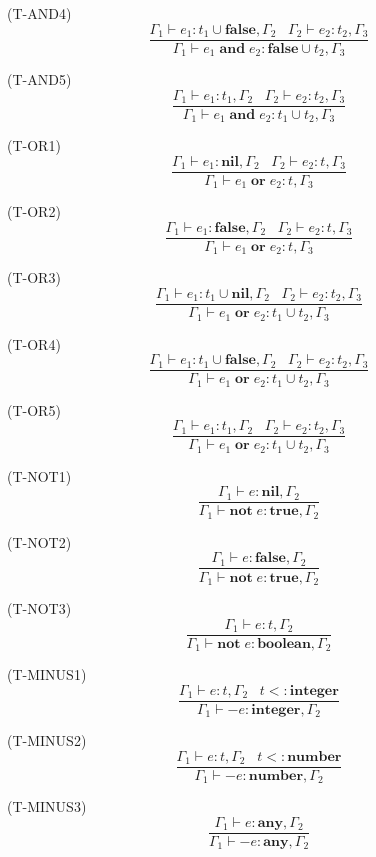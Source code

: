 \documentclass{paper}
\newcommand{\Any}{\mathbf{any}}
\newcommand{\Nil}{\mathbf{nil}}
\newcommand{\False}{\mathbf{false}}
\newcommand{\True}{\mathbf{true}}
\newcommand{\Boolean}{\mathbf{boolean}}
\newcommand{\Integer}{\mathbf{integer}}
\newcommand{\Number}{\mathbf{number}}
\newcommand{\mylabel}[1]{\; (\textsc{#1})}
\newcommand{\env}{\Gamma}
\newcommand{\subtype}{<:}
\begin{document}
\mylabel{T-AND4}
\[
\dfrac{\env_{1} \vdash e_{1}:t_{1} \cup \False, \env_{2} \;\;\;
       \env_{2} \vdash e_{2}:t_{2}, \env_{3}}
      {\env_{1} \vdash e_{1} \; \mathbf{and} \; e_{2}:\False \cup t_{2}, \env_{3}}
\]

\mylabel{T-AND5}
\[
\dfrac{\env_{1} \vdash e_{1}:t_{1}, \env_{2} \;\;\;
       \env_{2} \vdash e_{2}:t_{2}, \env_{3}}
      {\env_{1} \vdash e_{1} \; \mathbf{and} \; e_{2}:t_{1} \cup t_{2}, \env_{3}}
\]

\mylabel{T-OR1}
\[
\dfrac{\env_{1} \vdash e_{1}:\Nil, \env_{2} \;\;\;
       \env_{2} \vdash e_{2}:t, \env_{3}}
      {\env_{1} \vdash e_{1} \; \mathbf{or} \; e_{2}:t, \env_{3}}
\]

\mylabel{T-OR2}
\[
\dfrac{\env_{1} \vdash e_{1}:\False, \env_{2} \;\;\;
       \env_{2} \vdash e_{2}:t, \env_{3}}
      {\env_{1} \vdash e_{1} \; \mathbf{or} \; e_{2}:t, \env_{3}}
\]

\mylabel{T-OR3}
\[
\dfrac{\env_{1} \vdash e_{1}:t_{1} \cup \Nil, \env_{2} \;\;\;
       \env_{2} \vdash e_{2}:t_{2}, \env_{3}}
      {\env_{1} \vdash e_{1} \; \mathbf{or} \; e_{2}:t_{1} \cup t_{2}, \env_{3}}
\]

\mylabel{T-OR4}
\[
\dfrac{\env_{1} \vdash e_{1}:t_{1} \cup \False, \env_{2} \;\;\;
       \env_{2} \vdash e_{2}:t_{2}, \env_{3}}
      {\env_{1} \vdash e_{1} \; \mathbf{or} \; e_{2}:t_{1} \cup t_{2}, \env_{3}}
\]

\mylabel{T-OR5}
\[
\dfrac{\env_{1} \vdash e_{1}:t_{1}, \env_{2} \;\;\;
       \env_{2} \vdash e_{2}:t_{2}, \env_{3}}
      {\env_{1} \vdash e_{1} \; \mathbf{or} \; e_{2}:t_{1} \cup t_{2}, \env_{3}}
\]

\mylabel{T-NOT1}
\[
\dfrac{\env_{1} \vdash e:\Nil, \env_{2}}
      {\env_{1} \vdash \mathbf{not} \; e:\True, \env_{2}}
\]

\mylabel{T-NOT2}
\[
\dfrac{\env_{1} \vdash e:\False, \env_{2}}
      {\env_{1} \vdash \mathbf{not} \; e:\True, \env_{2}}
\]

\mylabel{T-NOT3}
\[
\dfrac{\env_{1} \vdash e:t, \env_{2}}
      {\env_{1} \vdash \mathbf{not} \; e:\Boolean, \env_{2}}
\]

\mylabel{T-MINUS1}
\[
\dfrac{\env_{1} \vdash e:t, \env_{2} \;\;\;
       t \subtype \Integer}
      {\env_{1} \vdash - e:\Integer, \env_{2}}
\]

\mylabel{T-MINUS2}
\[
\dfrac{\env_{1} \vdash e:t, \env_{2} \;\;\;
       t \subtype \Number}
      {\env_{1} \vdash - e:\Number, \env_{2}}
\]

\mylabel{T-MINUS3}
\[
\dfrac{\env_{1} \vdash e:\Any, \env_{2}}
      {\env_{1} \vdash - e:\Any, \env_{2}}
\]
\end{document}

